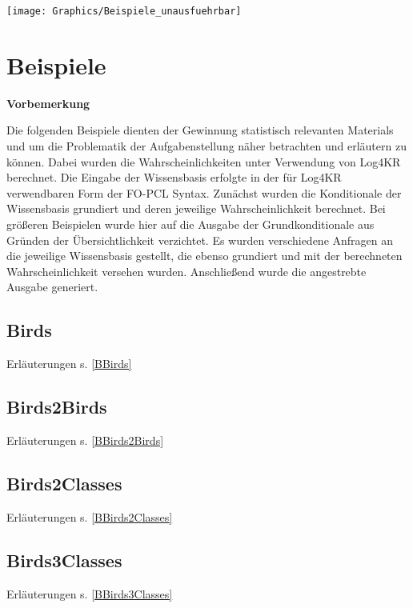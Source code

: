 \documentclass[a4paper, 11pt]{book}
\begin{document}
{\texttt{[image: Graphics/Beispiele\_unausfuehrbar]}
\begin{figure}[h]
	
\end{figure}




\chapter{Beispiele}
\label{examples}

\textbf{Vorbemerkung}

\noindent
Die folgenden Beispiele dienten der Gewinnung statistisch relevanten Materials und um die Problematik der Aufgabenstellung näher betrachten und erläutern zu können. Dabei wurden die Wahrscheinlichkeiten unter Verwendung von Log4KR berechnet. Die Eingabe der Wissensbasis erfolgte in der für Log4KR verwendbaren Form der FO-PCL Syntax. Zunächst wurden die Konditionale der Wissensbasis grundiert und deren jeweilige Wahrscheinlichkeit berechnet. Bei größeren Beispielen wurde hier auf die Ausgabe der Grundkonditionale aus Gründen der Übersichtlichkeit verzichtet.
Es wurden verschiedene Anfragen an die jeweilige Wissensbasis gestellt, die ebenso grundiert und mit der berechneten Wahrscheinlichkeit versehen wurden.
Anschließend wurde die angestrebte Ausgabe  generiert. 

\section{Birds} Erläuterungen s. \ref{BBirds}
\label{Birds}

\newpage

\section{Birds2Birds} Erläuterungen s. \ref{BBirds2Birds}
\label{Birds2Birds}

\newpage

\section{Birds2Classes} Erläuterungen s. \ref{BBirds2Classes}
\label{Birds2Classes}

\newpage

\section{Birds3Classes} Erläuterungen s. \ref{BBirds3Classes}
\label{Birds3Classes}

\newpage

}
\end{document}
